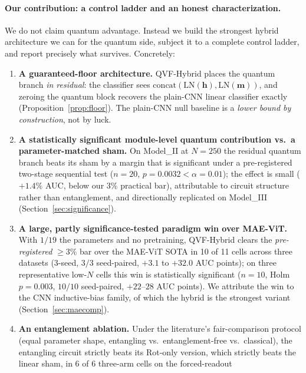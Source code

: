 \documentclass[10pt,letterpaper]{article}
\theoremstyle{plain}
\theoremstyle{definition}
\begin{document}
\paragraph{Our contribution: a control ladder and an honest characterization.}
We do not claim quantum advantage.
Instead we build the strongest hybrid architecture we can for the quantum side,
subject it to a complete control ladder, and report precisely what survives.
Concretely:
\begin{enumerate}
  \item \textbf{A guaranteed-floor architecture.}
        QVF-Hybrid places the quantum branch \emph{in residual}: the classifier
        sees $\mathrm{concat}(\mathrm{LN}(\mathbf{h}),\mathrm{LN}(\mathbf{m}))$,
        and zeroing the quantum block recovers the plain-CNN linear classifier
        exactly (Proposition~\ref{prop:floor}). The plain-CNN null baseline is a
        \emph{lower bound by construction}, not by luck.
  \item \textbf{A statistically significant module-level quantum contribution
        vs.\ a parameter-matched sham.}
        On Model\_II at $N{=}250$ the residual quantum branch beats its sham by a
        margin that is significant under a pre-registered two-stage sequential
        test ($n{=}20$, $p{=}0.0032 < \alpha{=}0.01$); the effect is small
        ($+1.4\%$ AUC, below our $3\%$ practical bar), attributable to circuit
        structure rather than entanglement, and directionally replicated on
        Model\_III (Section~\ref{sec:significance}).
  \item \textbf{A large, partly significance-tested paradigm win over MAE-ViT.}
        With $1/19$ the parameters and no pretraining, QVF-Hybrid clears the
        \emph{pre-registered} $\geq 3\%$ bar over the MAE-ViT SOTA in 10 of 11
        cells across three datasets ($3$-seed, $3/3$ seed-paired, $+3.1$ to
        $+32.0$ AUC points); on three representative low-$N$ cells this win is
        statistically significant ($n{=}10$, Holm $p{=}0.003$, $10/10$
        seed-paired, $+22$--$28$ AUC points). We attribute the win to the CNN
        inductive-bias family, of which the hybrid is the strongest variant
        (Section~\ref{sec:maecomp}).
  \item \textbf{An entanglement ablation.}
        Under the literature's fair-comparison protocol
        (equal parameter shape, entangling vs.\ entanglement-free vs.\ classical),
        the entangling circuit strictly beats its Rot-only version, which strictly
        beats the linear sham, in 6 of 6 three-arm cells on the forced-readout

\end{enumerate}
\end{document}
